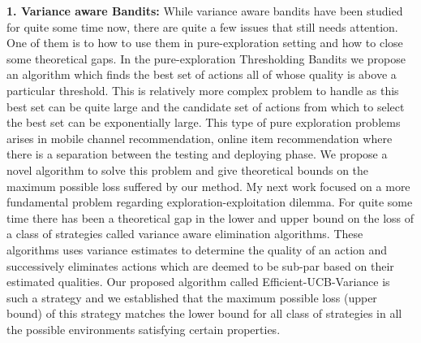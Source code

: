 \documentclass[twoside]{article}
\begin{document}


\textbf{1. Variance aware Bandits:} While variance aware bandits have been studied for quite some time now, there are quite a few issues that still needs attention. One of them is to how to use them in pure-exploration setting and how to close some theoretical gaps. In the pure-exploration Thresholding Bandits \citep{mukherjee2016} we propose an algorithm which finds the best set of actions all of whose quality is above a particular threshold. This is relatively more complex problem to handle as this best set can be quite large and the candidate set of actions from which to select the best set can be exponentially large. This type of pure exploration problems arises in mobile channel recommendation, online item recommendation where there is a separation between the testing and deploying phase. We propose a novel algorithm to solve this problem and give theoretical bounds on the maximum possible loss suffered by our method. My next work focused on a more fundamental problem regarding exploration-exploitation dilemma. For quite some time there has been a theoretical gap in the lower and upper bound on the loss of a class of strategies called variance aware elimination algorithms. These algorithms uses variance estimates to determine the quality of an action and successively eliminates actions which are deemed to be sub-par based on their estimated qualities. Our proposed algorithm called Efficient-UCB-Variance \citep{mukherjee2018} is such a strategy and we established that the maximum possible loss (upper bound) of this strategy matches the lower bound for all class of strategies in all the possible environments satisfying certain properties.
\end{document}
